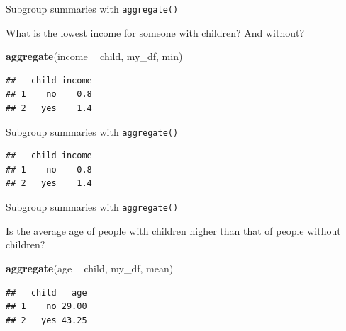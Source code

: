 \documentclass[ignorenonframetext,]{beamer}
\newenvironment{Shaded}{\begin{snugshade}}{\end{snugshade}}
\newcommand{\DataTypeTok}[1]{\textcolor[rgb]{0.13,0.29,0.53}{#1}}
\newcommand{\KeywordTok}[1]{\textcolor[rgb]{0.13,0.29,0.53}{\textbf{#1}}}
\newcommand{\NormalTok}[1]{#1}
\newcommand{\OperatorTok}[1]{\textcolor[rgb]{0.81,0.36,0.00}{\textbf{#1}}}
\newcommand{\StringTok}[1]{\textcolor[rgb]{0.31,0.60,0.02}{#1}}
\begin{document}
\begin{frame}[fragile]{Subgroup summaries with \texttt{aggregate()}}
\protect\hypertarget{subgroup-summaries-with-aggregate-9}{}

What is the lowest income for someone with children? And without?

\begin{Shaded}
\begin{Highlighting}[]
\KeywordTok{aggregate}\NormalTok{(income }\OperatorTok{~}\StringTok{ }\NormalTok{child, my_df, min)}
\end{Highlighting}
\end{Shaded}

\begin{verbatim}
##   child income
## 1    no    0.8
## 2   yes    1.4
\end{verbatim}

\end{frame}

\begin{frame}[fragile]{Subgroup summaries with \texttt{aggregate()}}
\protect\hypertarget{subgroup-summaries-with-aggregate-10}{}

\begin{Shaded}
\end{Shaded}

\begin{verbatim}
##   child income
## 1    no    0.8
## 2   yes    1.4
\end{verbatim}

\end{frame}

\begin{frame}[fragile]{Subgroup summaries with \texttt{aggregate()}}
\protect\hypertarget{subgroup-summaries-with-aggregate-11}{}

Is the average age of people with children higher than that of people
without children?

\begin{Shaded}
\begin{Highlighting}[]
\KeywordTok{aggregate}\NormalTok{(age }\OperatorTok{~}\StringTok{ }\NormalTok{child, my_df, mean)}
\end{Highlighting}
\end{Shaded}

\begin{verbatim}
##   child   age
## 1    no 29.00
## 2   yes 43.25
\end{verbatim}

\end{frame}
\end{document}
